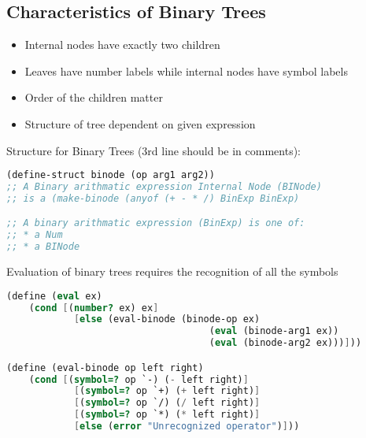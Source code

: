 \documentclass[english, 12pt]{article}
\begin{document}
\subsection{Characteristics of Binary Trees}
\begin{itemize}
\item Internal nodes have exactly two children
\item Leaves have number labels while internal nodes have symbol labels
\item Order of the children matter
\item Structure of tree dependent on given expression
\end{itemize}
\begin{exmp}
Structure for Binary Trees (3rd line should be in comments):
\begin{lstlisting}[language=Scheme]
(define-struct binode (op arg1 arg2))
;; A Binary arithmatic expression Internal Node (BINode)
;; is a (make-binode (anyof (+ - * /) BinExp BinExp)

;; A binary arithmatic expression (BinExp) is one of:
;; * a Num
;; * a BINode
\end{lstlisting}
\end{exmp}
\begin{defn}
Evaluation of binary trees requires the recognition of all the symbols
\begin{lstlisting}[language=Scheme]
(define (eval ex)
	(cond [(number? ex) ex]
		  	[else (eval-binode (binode-op ex)
									(eval (binode-arg1 ex))
									(eval (binode-arg2 ex)))]))

(define (eval-binode op left right)
	(cond [(symbol=? op `-) (- left right)]
			[(symbol=? op `+) (+ left right)]
			[(symbol=? op `/) (/ left right)]
			[(symbol=? op `*) (* left right)]
			[else (error "Unrecognized operator")]))
\end{lstlisting}
\end{defn}
\end{document}

